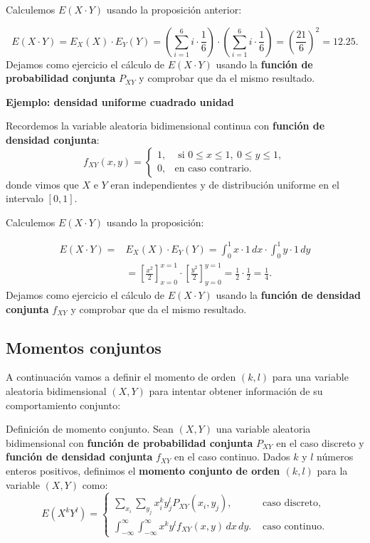 \documentclass[]{book}
\begin{document}
Calculemos \(E(X\cdot Y)\) usando la proposición anterior:

\[
E(X\cdot Y)=\displaystyle E_X(X)\cdot E_Y(Y)=\left(\sum_{i=1}^6 i\cdot \frac{1}{6}\right)\cdot \left(\sum_{i=1}^6 i\cdot \frac{1}{6}\right)=\left(\frac{21}{6}\right)^2 = 12.25.
\]
Dejamos como ejercicio el cálculo de \(E(X\cdot Y)\) usando la \textbf{función de probabilidad conjunta} \(P_{XY}\) y comprobar que da el mismo resultado.

\textbf{Ejemplo: densidad uniforme cuadrado unidad}

Recordemos la variable aleatoria bidimensional continua con \textbf{función de densidad conjunta}:
\[
f_{XY}(x,y)=\displaystyle \begin{cases}
1, & \mbox{ si }0\leq x\leq 1,\ 0\leq y\leq 1, \\
0, & \mbox{en caso contrario.}
\end{cases}
\]
donde vimos que \(X\) e \(Y\) eran independientes y de distribución uniforme en el intervalo \([0,1]\).

Calculemos \(E(X\cdot Y)\) usando la proposición:

\[
\begin{array}{rl}
E(X\cdot Y)= & \displaystyle E_X(X)\cdot E_Y(Y)=\int_0^1 x\cdot 1\, dx\cdot \int_0^1 y\cdot 1\, dy\\
& =\left[\frac{x^2}{2}\right]_{x=0}^{x=1}\cdot \left[\frac{y^2}{2}\right]_{y=0}^{y=1}=\frac{1}{2}\cdot \frac{1}{2}=\frac{1}{4}.
\end{array}
\]
Dejamos como ejercicio el cálculo de \(E(X\cdot Y)\) usando la \textbf{función de densidad conjunta} \(f_{XY}\) y comprobar que da el mismo resultado.

\hypertarget{momentos-conjuntos}{%
\subsection{Momentos conjuntos}\label{momentos-conjuntos}}

A continuación vamos a definir el momento de orden \((k,l)\) para una variable aleatoria bidimensional \((X,Y)\) para intentar obtener información de su comportamiento conjunto:

Definición de momento conjunto.
Sean \((X,Y)\) una variable aleatoria bidimensional con \textbf{función de probabilidad conjunta} \(P_{XY}\) en el caso discreto y \textbf{función de densidad conjunta} \(f_{XY}\) en el caso continuo. Dados \(k\) y \(l\) números enteros positivos, definimos el \textbf{momento conjunto de orden \((k,l)\)} para la variable \((X,Y)\) como:
\[
E\left(X^k Y^l\right)=\begin{cases}
\displaystyle \sum_{x_i}\sum_{y_j} x_i^k y_j^l P_{XY}(x_i,y_j), & \mbox{ caso discreto,} \\\displaystyle
\int_{-\infty}^\infty\int_{-\infty}^\infty x^k y^l f_{XY}(x,y)\, dx\, dy. & \mbox{ caso continuo.}
\end{cases}
\]
\end{document}
